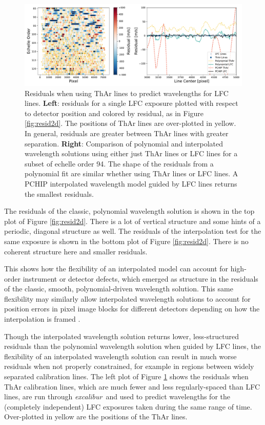 \documentclass[twocolumn,table,xcolor,trackchanges]{aastex63}
\newcommand{\project}[1]{\textsl{#1}}
\newcommand{\name}{\project{excalibur}}
\begin{document}
\begin{figure}[t]
\centering
\includegraphics[width=\textwidth]{Figures/lineDensity.pdf}
\caption{Residuals when using ThAr lines to predict wavelengths for LFC lines.  \textbf{Left}: residuals for a single LFC exposure plotted with respect to detector position and colored by residual, as in Figure \ref{fig:resid2d}.  The positions of ThAr lines are over-plotted in yellow.  In general, residuals are greater between ThAr lines with greater separation.
\textbf{Right}: Comparison of polynomial and interpolated wavelength solutions using either just ThAr lines or LFC lines for a subset of echelle order 94.  The shape of the residuals from a polynomial fit are similar whether using ThAr lines or LFC lines.  A PCHIP interpolated wavelength model guided by LFC lines returns the smallest residuals.}
\label{fig:waveResids}
\end{figure}

The residuals of the classic, polynomial wavelength solution is shown in the top plot of Figure \ref{fig:resid2d}.  There is a lot of vertical structure and some hints of a periodic, diagonal structure as well.  The residuals of the interpolation test for the same exposure is shown in the bottom plot of Figure \ref{fig:resid2d}.  There is no coherent structure here and smaller residuals. 

This shows how the flexibility of an interpolated model can account for high-order instrument or detector defects, which emerged as structure in the residuals of the classic, smooth, polynomial-driven wavelength solution.  This same flexibility may similarly allow interpolated wavelength solutions to account for position errors in pixel image blocks for different detectors depending on how the interpolation is framed \citep{fischer2016, milakovic2020}.

Though the interpolated wavelength solution returns lower, less-structured residuals than the polynomial wavelength solution when guided by LFC lines, the flexibility of an interpolated wavelength solution can result in much worse residuals when not properly constrained, for example in regions between widely separated calibration lines.  The left plot of Figure \ref{fig:waveResids} shows the residuals when ThAr calibration lines, which are much fewer and less regularly-spaced than LFC lines, are run through \name\ and used to predict wavelengths for the (completely independent) LFC exposures taken during the same range of time.  Over-plotted in yellow are the positions of the ThAr lines. 
\end{document}
